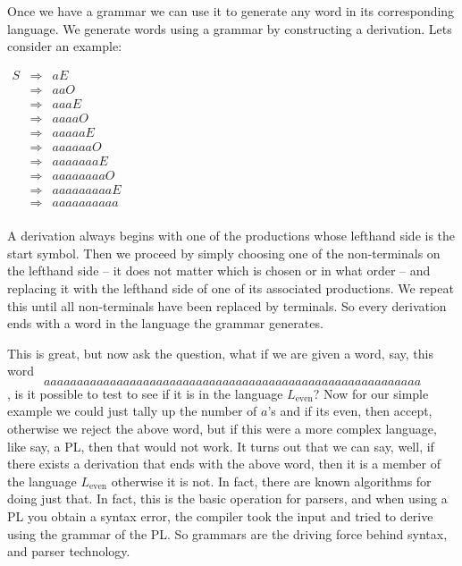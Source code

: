 \documentclass{article}
\begin{document}
Once we have a grammar we can use it to generate any word in its
corresponding language.  We generate words using a grammar by
constructing a derivation.  Lets consider an example:
\begin{center}
  \begin{math}
    \begin{array}{lll}
      S & \Rightarrow & aE\\
        & \Rightarrow & aaO\\
        & \Rightarrow & aaaE\\
        & \Rightarrow & aaaaO\\
        & \Rightarrow & aaaaaE\\
        & \Rightarrow & aaaaaaO\\
        & \Rightarrow & aaaaaaaE\\
        & \Rightarrow & aaaaaaaaO\\
        & \Rightarrow & aaaaaaaaaE\\
        & \Rightarrow & aaaaaaaaaa\\
    \end{array}
  \end{math}
\end{center}
A derivation always begins with one of the productions whose lefthand
side is the start symbol.  Then we proceed by simply choosing one of
the non-terminals on the lefthand side -- it does not matter which is
chosen or in what order -- and replacing it with the lefthand side of
one of its associated productions. We repeat this until all
non-terminals have been replaced by terminals.  So every derivation
ends with a word in the language the grammar generates.

This is great, but now ask the question, what if we are given a word,
say, this
word \[aaaaaaaaaaaaaaaaaaaaaaaaaaaaaaaaaaaaaaaaaaaaaaaaaaaaaaaaa\], is
it possible to test to see if it is in the language $L_{\text{even}}$?
Now for our simple example we could just tally up the number of $a$'s
and if its even, then accept, otherwise we reject the above word, but
if this were a more complex language, like say, a PL, then that would
not work.  It turns out that we can say, well, if there exists a
derivation that ends with the above word, then it is a member of the
language $L_{\text{even}}$ otherwise it is not.  In fact, there are
known algorithms for doing just that.  In fact, this is the basic
operation for parsers, and when using a PL you obtain a syntax error,
the compiler took the input and tried to derive using the grammar of
the PL.  So grammars are the driving force behind syntax, and parser
technology.
\end{document}
